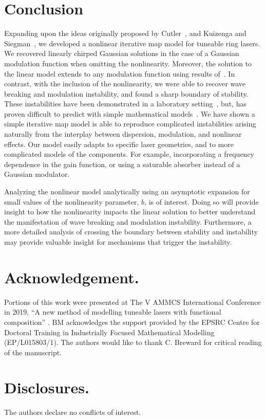 \documentclass[9pt,twocolumn,twoside]{osajnl}
\begin{document}
\section{Conclusion}
\label{sec:conclusion}
Expanding upon the ideas originally proposed by Cutler~\cite{cutler1955}, and Kuizenga and Siegman~\cite{kuizenga1970, kuizenga1970a, siegman1969}, we developed a nonlinear iterative map model for tuneable ring lasers. We recovered linearly chirped Gaussian solutions in the case of a Gaussian modulation function when omitting the nonlinearity. Moreover, the solution to the linear model extends to any modulation function using results of~\cite{calcaterra2008a}. In contrast, with the inclusion of the nonlinearity, we were able to recover wave breaking and modulation instability, and found a sharp boundary of stability. These instabilities have been demonstrated in a laboratory setting~\cite{agrawal2013, anderson1992, finot2008, rothenberg1989b, tomlinson1985}, but, has proven difficult to predict with simple mathematical models~\cite{meng2020}. We have shown a simple iterative map model is able to reproduce complicated instabilities arising naturally from the interplay between dispersion, modulation, and nonlinear effects. Our model easily adapts to specific laser geometries, and to more complicated models of the components. For example, incorporating a frequency dependence in the gain function, or using a saturable absorber instead of a Gaussian modulator.

Analyzing the nonlinear model analytically using an asymptotic expansion for small values of the nonlinearity parameter, $b$, is of interest. Doing so will provide insight to how the nonlinearity impacts the linear solution to better understand the manifestation of wave breaking and modulation instability. Furthermore, a more detailed analysis of crossing the boundary between stability and instability may provide valuable insight for mechanisms that trigger the instability.

\section*{Acknowledgement.}

Portions of this work were presented at The V AMMCS International Conference in 2019, ``A new method of modelling tuneable lasers with functional composition'' \cite{metherallammcs}. BM acknowledges the support provided by the EPSRC Centre for Doctoral Training in Industrially Focused Mathematical Modelling (EP/L015803/1). The authors would like to thank C. Breward for critical reading of the manuscript.

\section*{Disclosures.}
The authors declare no conflicts of interest.


\end{document}
